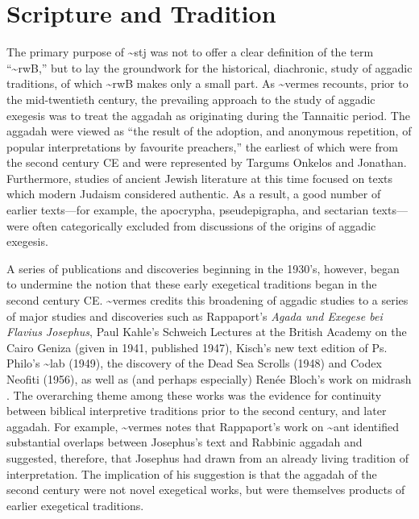 \hypertarget{scripture-and-tradition}{%
\section{Scripture and Tradition}\label{scripture-and-tradition}}

The primary purpose of \textasciitilde{}stj was not to offer a clear
definition of the term ``\textasciitilde{}rwB,'' but to lay the
groundwork for the historical, diachronic, study of aggadic traditions,
of which \textasciitilde{}rwB makes only a small
part.\autocite[3]{vermes_zsengeller2014} As \textasciitilde{}vermes
recounts, prior to the mid-twentieth century, the prevailing approach to
the study of aggadic exegesis was to treat the aggadah as originating
during the Tannaitic period. The aggadah were viewed as ``the result of
the adoption, and anonymous repetition, of popular interpretations by
favourite preachers,'' \autocite[3]{vermes1961} the earliest of which
were from the second century CE and were represented by Targums Onkelos
and Jonathan. Furthermore, studies of ancient Jewish literature at this
time focused on texts which modern Judaism considered authentic. As a
result, a good number of earlier texts---for example, the apocrypha,
pseudepigrapha, and sectarian texts---were often categorically excluded
from discussions of the origins of aggadic
exegesis.\autocite[2]{vermes1961}

A series of publications and discoveries beginning in the 1930's,
however, began to undermine the notion that these early exegetical
traditions began in the second century CE. \textasciitilde{}vermes
credits this broadening of aggadic studies to a series of major studies
and discoveries such as Rappaport's \emph{Agada und Exegese bei Flavius
Josephus},\autocite{rappaport1930} Paul Kahle's Schweich Lectures at the
British Academy on the Cairo Geniza (given in 1941, published
1947),\autocite{kahle1947} Kisch's new text edition of Ps. Philo's
\textasciitilde{}lab (1949),\autocite{kisch1949} the discovery of the
Dead Sea Scrolls (1948) and Codex Neofiti (1956), as well as (and
perhaps especially) Renée Bloch's work on midrash
\autocites{bloch1954}{bloch1955_repr}[3--7]{vermes1961}. The overarching
theme among these works was the evidence for continuity between biblical
interpretive traditions prior to the second century, and later aggadah.
For example, \textasciitilde{}vermes notes that Rappaport's work on
\textasciitilde{}ant identified substantial overlaps between Josephus's
text and Rabbinic aggadah and suggested, therefore, that Josephus had
drawn from an already living tradition of interpretation. The
implication of his suggestion is that the aggadah of the second century
were not novel exegetical works, but were themselves products of earlier
exegetical traditions.

